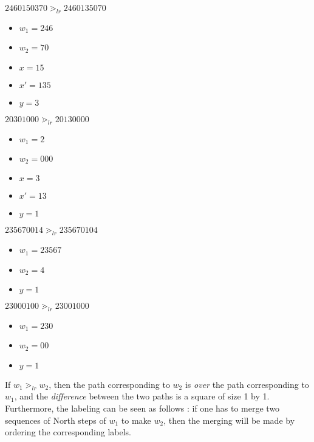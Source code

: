 \begin{example}[$a > b : a = 7, b = 3$, second case]
    $2460150370 \gtrdot_{lr} 2460135070$
    \begin{itemize}
        \item $w_1 = 246$
        \item $w_2 = 70$
        \item $x = 15$
        \item $x' = 135$
        \item $y = 3$
    \end{itemize}
\end{example}

\begin{example}[$a < b : a = 3, b = 5$, second case]
    $20301000 \gtrdot_{lr} 20130000 $
    \begin{itemize}
        \item $w_1 = 2$
        \item $w_2 = 000$
        \item $x = 3$
        \item $x' = 13$
        \item $y = 1$
    \end{itemize}
\end{example}

\begin{example}[$a > b : a = 7, b = 3$, third case]
    $235670014 \gtrdot_{lr} 235670104$
    \begin{itemize}
        \item $w_1 = 23567$
        \item $w_2 = 4$
        \item $y = 1$
    \end{itemize}
\end{example}

\begin{example}[$a < b : a = 3, b = 5$, third case]
    $23000100 \gtrdot_{lr} 23001000$
    \begin{itemize}
        \item $w_1 = 230$
        \item $w_2 = 00$
        \item $y = 1$
    \end{itemize}
\end{example}

\begin{rem}
    If $w_1 \gtrdot_{lr} w_2$, then the path corresponding to
    $w_2$ is \emph{over} the path corresponding to $w_1$,
    and the \emph{difference} between the two paths is a
    square of size 1 by 1.\\
    Furthermore, the labeling can be seen as follows :
    if one has to merge two sequences of North steps of $w_1$
    to make $w_2$, then the merging will be made by ordering the
    corresponding labels.
\end{rem}

